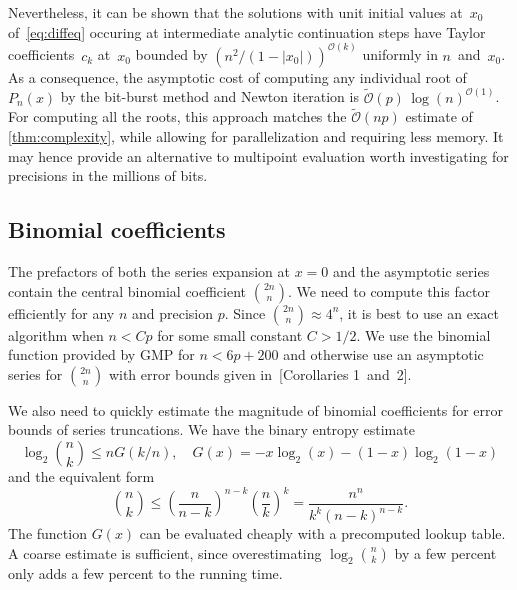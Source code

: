 \documentclass[nohypdvips,review]{siamart0216}
\newcommand{\OO}{\mathcal{O}}
\newcommand{\OOtilde}{\widetilde{\mathcal{O}}}
\begin{document}
Nevertheless, it can be shown that the solutions with unit initial
values at~$x_0$ of~\cref{eq:diffeq} occuring at intermediate analytic
continuation steps have Taylor coefficients~$c_k$ at~$x_0$ bounded by
$(n^2/(1-|x_0|))^{\OO(k)}$
uniformly in $n$~and~$x_0$.
As a consequence, the asymptotic cost of computing any individual root
of $P_n(x)$ by the bit-burst method and Newton iteration is
$\OOtilde(p) \, \log(n)^{\OO(1)}$.
For computing all the roots, this approach matches the $\OOtilde(np)$
estimate of \cref{thm:complexity}, while allowing for
parallelization and requiring less memory.
It may hence provide an alternative to multipoint
evaluation
worth investigating for precisions in the millions of bits.

\subsection{Binomial coefficients}

\label{sec:binomial}

The prefactors of both the series expansion at ${x = 0}$ and the asymptotic series
contain the central binomial coefficient ${2n \choose n}$.
We need to compute this factor efficiently for any $n$ and precision $p$.
Since ${2n \choose n} \approx 4^n$, it is best to use
an exact algorithm when $n < Cp$ for some small constant $C > 1/2$.
We use the binomial function provided by GMP for $n < 6p + 200$
and otherwise use an asymptotic series for ${2n \choose n}$
with error bounds given
in~[Corollaries 1~and~2]\cite{brent2016asymptotic}.

We also need to quickly estimate the magnitude of binomial coefficients
for error bounds of series truncations.
We have the binary entropy estimate
$$\log_2 {n \choose k} \le n G(k/n), \quad G(x) = -x \log_2(x) - (1-x) \log_2(1-x)$$
and the equivalent form
\begin{equation}
\label{eq:binbound}
{n \choose k} \le \left(\frac{n}{n-k}\right)^{n-k} \left(\frac{n}{k}\right)^k = \frac{n^n}{k^k (n-k)^{n-k}}.
\end{equation}
The function $G(x)$ can be evaluated cheaply with a precomputed
lookup table. A coarse estimate is sufficient, since overestimating
$\log_2 {n \choose k}$ by a few percent only adds a few
percent to the running time.
\end{document}

